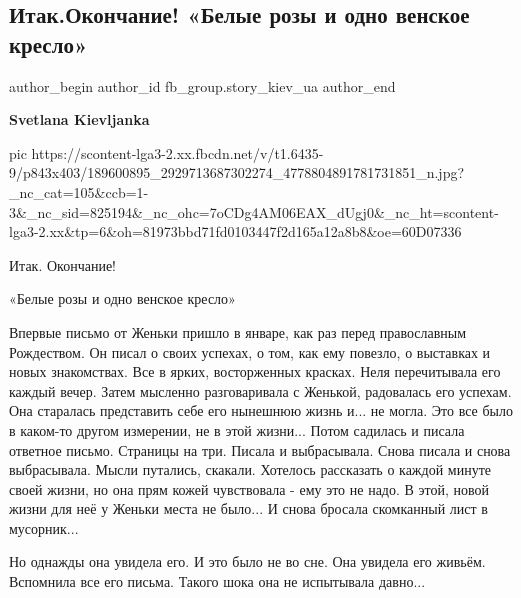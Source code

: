  
 
 
 
 
 
\subsection{Итак.Окончание! «Белые розы и одно венское кресло»}
\label{sec:22_05_2021.fb.fb_group.story_kiev_ua.1.belye_rozy_okonchanie}
\ifcmt
 author_begin
   author_id fb_group.story_kiev_ua
 author_end
\fi

\textbf{Svetlana Kievljanka}


\ifcmt
  pic https://scontent-lga3-2.xx.fbcdn.net/v/t1.6435-9/p843x403/189600895_2929713687302274_4778804891781731851_n.jpg?_nc_cat=105&ccb=1-3&_nc_sid=825194&_nc_ohc=7oCDg4AM06EAX_dUgj0&_nc_ht=scontent-lga3-2.xx&tp=6&oh=81973bbd71fd0103447f2d165a12a8b8&oe=60D07336
\fi

Итак. Окончание! 

«Белые розы и одно венское кресло»

Впервые письмо от Женьки пришло в январе, как раз перед православным
Рождеством. Он писал о своих успехах, о том, как ему повезло, о выставках и новых
знакомствах. Все в ярких, восторженных красках. Неля перечитывала его каждый
вечер. Затем мысленно разговаривала с Женькой, радовалась его успехам. Она
старалась представить себе его нынешнюю жизнь и... не могла. Это все было в
каком-то другом измерении, не в этой жизни... Потом садилась и писала ответное
письмо. Страницы на три. Писала и выбрасывала. Снова писала и снова
выбрасывала. Мысли путались, скакали. Хотелось рассказать о каждой минуте своей
жизни, но она прям кожей чувствовала - ему это не надо. В этой, новой жизни для
неё у Женьки места не было... И снова бросала скомканный лист в мусорник...

Но однажды она увидела его. И это было не во сне. Она увидела его живьём.
Вспомнила все его письма. Такого шока она не испытывала давно...

